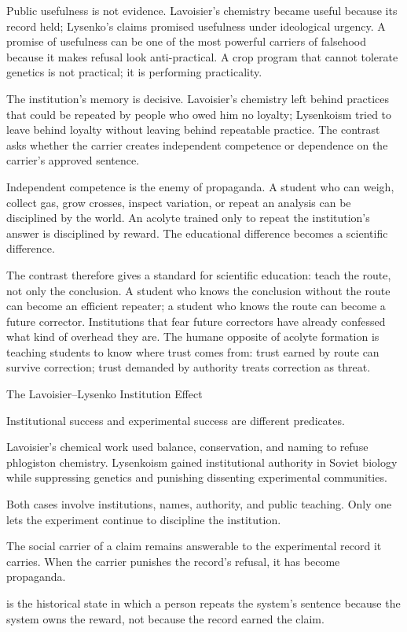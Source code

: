 Public usefulness is not evidence. Lavoisier's chemistry became useful
because its record held; Lysenko's claims promised usefulness under
ideological urgency. A promise of usefulness can be one of the most
powerful carriers of falsehood because it makes refusal look
anti-practical. A crop program that cannot tolerate genetics is not
practical; it is performing practicality.

The institution's memory is decisive. Lavoisier's chemistry left behind
practices that could be repeated by people who owed him no loyalty;
Lysenkoism tried to leave behind loyalty without leaving behind
repeatable practice. The contrast asks whether the carrier creates
independent competence or dependence on the carrier's approved
sentence.

Independent competence is the enemy of propaganda. A student who can
weigh, collect gas, grow crosses, inspect variation, or repeat an
analysis can be disciplined by the world. An acolyte trained only to
repeat the institution's answer is disciplined by reward. The
educational difference becomes a scientific difference.

The contrast therefore gives a standard for scientific education: teach
the route, not only the conclusion. A student who knows the conclusion
without the route can become an efficient repeater; a student who knows
the route can become a future corrector. Institutions that fear future
correctors have already confessed what kind of overhead they are. The
humane opposite of acolyte formation is teaching students to know where
trust comes from: trust earned by route can survive correction; trust
demanded by authority treats correction as threat.

\begin{phenom}{The Lavoisier--Lysenko Institution Effect~\cite{lavoisier1789,lysenko1948}}
\label{ph:lavoisier-lysenko-institution}

\PhStatement
Institutional success and experimental success are different predicates.

\PhOrigin
Lavoisier's chemical work used balance, conservation, and naming to refuse
phlogiston chemistry. Lysenkoism gained institutional authority in Soviet
biology while suppressing genetics and punishing dissenting experimental
communities.

\PhObservation
Both cases involve institutions, names, authority, and public teaching. Only
one lets the experiment continue to discipline the institution.

\PhConstraint
The social carrier of a claim remains answerable to the experimental record
it carries. When the carrier punishes the record's refusal, it has become
propaganda.

\PhConsequence
{} is the historical state in which a person repeats the system's
sentence because the system owns the reward, not because the record earned the
claim.
\end{phenom}

